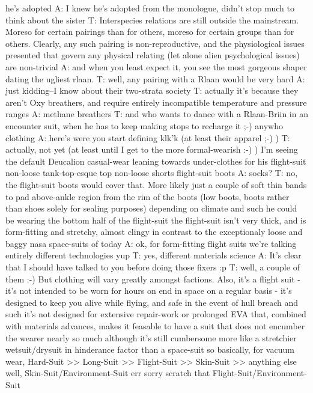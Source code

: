 he's adopted
A: I knew he's adopted from the monologue, didn't stop much to think about the sister
T: Interspecies relations are still outside the mainstream. Moreso for certain pairings than for others, moreso for certain groups than for others.
Clearly, any such pairing is non-reproductive, and the physiological issues presented that govern any physical relating (let alone alien psychological issues) are non-trivial
A: and when you least expect it, you see the most gorgeous shaper dating the ugliest rlaan.
T: well, any pairing with a Rlaan would be very hard
A: just kidding--I know about their two-strata society
T: actually it's because they aren't Oxy breathers, and require entirely incompatible temperature and pressure ranges
A: methane breathers
T: and who wants to dance with a Rlaan-Briin in an encounter suit, when he has to keep making stops to recharge it ;-)
anywho
clothing
A: here's were you start defining klk'k (at least their apparel ;-) )
T: actually, not yet (at least until I get to the more formal-wearish :-) )
I'm seeing the default Deucalion casual-wear leaning towards under-clothes for his flight-suit
non-loose tank-top-esque top
non-loose shorts
flight-suit boots
A: socks?
T: no, the flight-suit boots would cover that. More likely just a couple of soft thin bands to pad above-ankle region from the rim of the boots (low boots, boots rather than shoes solely for sealing purposes)
depending on climate and such
he could be wearing the bottom half of the flight-suit
the flight-suit isn't very thick, and is form-fitting and stretchy, almost clingy
in contrast to the exceptionaly loose and baggy nasa space-suits of today
A: ok, for form-fitting flight suits we're talking entirely different technologies
yup
T: yes, different materials science
A: It's clear that I should have talked to you before doing those fixers :p
T: well, a couple of them :-) But clothing will vary greatly amongst factions. Also, it's a flight suit - it's not intended to be worn for hours on end in space on a regular basis - it's designed to keep you alive while flying, and safe in the event of hull breach and such
it's not designed for extensive repair-work or prolonged EVA
that, combined with materials advances, makes it feasable to have a suit that does not encumber the wearer nearly so much
although it's still cumbersome
more like a stretchier wetsuit/drysuit in hinderance factor than a space-suit
so basically, for vacuum wear, Hard-Suit >> Long-Suit >> Flight-Suit >> Skin-Suit >> anything else
well, Skin-Suit/Environment-Suit
err sorry scratch that
Flight-Suit/Environment-Suit

